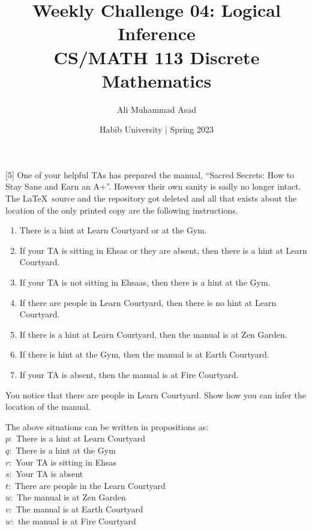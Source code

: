 \documentclass[a4paper]{exam}
\title{Weekly Challenge 04: Logical Inference\\CS/MATH 113 Discrete Mathematics}
\author{Ali Muhammad Asad}  %
\date{Habib University | Spring 2023}
\begin{document}
\maketitle

\begin{questions}

  [5] One of your helpful TAs has prepared the manual, ``Sacred Secrets: How to Stay Sane and Earn an A+''. However their own sanity is sadly no longer intact. The \LaTeX\ source and the repository got deleted and all that exists about the location of the only printed copy are the following instructions.
  \begin{enumerate}
  \item There is a hint at Learn Courtyard or at the Gym.
  \item If your TA is sitting in Ehsas or they are absent, then there is a hint at Learn Courtyard.
  \item If your TA is not sitting in Ehsaas, then there is a hint at the Gym.
  \item If there are people in Learn Courtyard, then there is no hint at Learn Courtyard.
  \item If there is a hint at Learn Courtyard, then the manual is at Zen Garden.
  \item If there is hint at the Gym, then the manual is at Earth Courtyard.
  \item If your TA is absent, then the manual is at Fire Courtyard.
  \end{enumerate}
  You notice that there are people in Learn Courtyard. Show how you can infer the location of the manual.

  \begin{solution}
    
    The above situations can be written in propositions as: \\ 
    \hspace*{2mm} $p:$ There is a hint at Learn Courtyard \\ 
    \hspace*{2mm} $q:$ There is a hint at the Gym \\ 
    \hspace*{2mm} $r:$ Your TA is sitting in Ehsas \\ 
    \hspace*{2mm} $s:$ Your TA is absent \\ 
    \hspace*{2mm} $t:$ There are people in the Learn Courtyard \\ 
    \hspace*{2mm} $u:$ The manual is at Zen Garden \\ 
    \hspace*{2mm} $v:$ The manual is at Earth Courtyard \\ 
    \hspace*{2mm} $w:$ the manual is at Fire Courtyard


\end{solution}
\end{questions}
\end{document}
